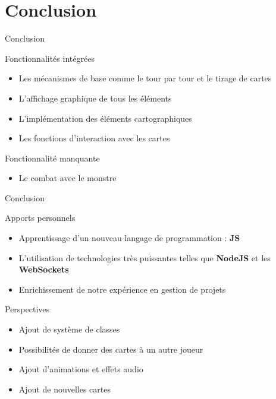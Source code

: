 \documentclass{bredelebeamer}
\begin{document}
\section{Conclusion}

\begin{frame}{Conclusion}
\begin{block}{Fonctionnalités intégrées}
    \begin{itemize}
      \item {Les mécanismes de base comme le tour par tour et le tirage de cartes}
      \pause
      \item {L’affichage graphique de tous les éléments}
      \pause
      \item {L’implémentation des éléments cartographiques}
      \pause
      \item {Les fonctions d’interaction avec les cartes}
    \end{itemize}
  \end{block}

	\begin{block}{Fonctionnalité manquante}
	    \begin{itemize}
	      \pause
	      \item {Le combat avec le monstre}
	    \end{itemize}
	  \end{block}
\end{frame}

\begin{frame}{Conclusion}
\begin{block}{Apports personnels}
\begin{itemize}
\item {Apprentissage d'un nouveau langage de programmation : \textbf{JS}}
\pause
\item {L'utilisation de technologies très puissantes telles que \textbf{NodeJS }et les \textbf{WebSockets}}
\pause
\item { Enrichissement de notre expérience en gestion de projets}
\end{itemize}
\end{block}

\begin{block}{Perspectives}
	\begin{itemize}
		\item{Ajout de système de classes}
		\pause
		\item{Possibilités de donner des cartes à un autre joueur}
		\pause
		\item{Ajout d'animations et effets audio}
		\pause
		\item{Ajout de nouvelles cartes}
	\end{itemize}
	
\end{block}
\end{frame}
\end{document}
